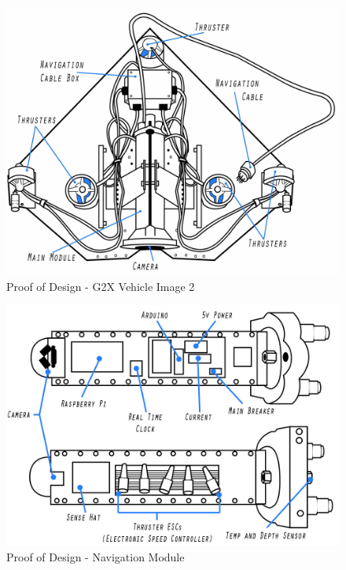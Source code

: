 \documentclass[12pt]{article}
\begin{document}
{		\begin{figure}[!htb]
			\centering
			\includegraphics[width = 120mm]{assets/inside_sub.jpg}
			\caption{Proof of Design - G2X Vehicle Image 2 \label{overflow}}
		\end{figure}
	
		\begin{figure}[!htb]
			\centering
			\includegraphics[width = 115mm]{assets/navigation_board.jpg}
			\caption{Proof of Design - Navigation Module \label{overflow}}
		\end{figure}
	
}
\end{document}

